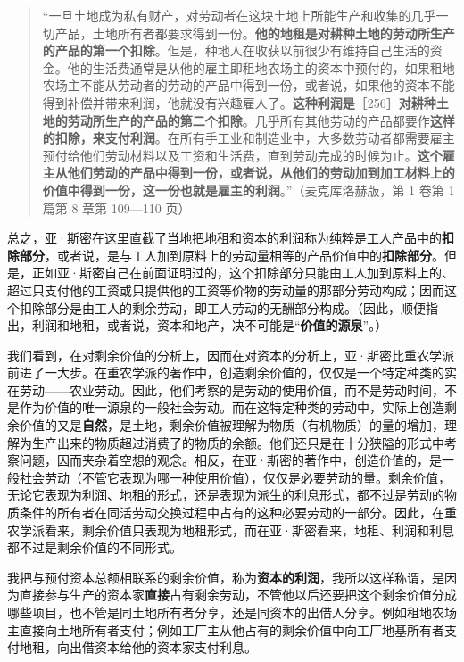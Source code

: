 \begin{quote}“一旦土地成为私有财产，对劳动者在这块土地上所能生产和收集的几乎一切产品，土地所有者都要求得到一份。\textbf{他的地租是对耕种土地的劳动所生产的产品的第一个扣除}。但是，种地人在收获以前很少有维持自己生活的资金。他的生活费通常是从他的雇主即租地农场主的资本中预付的，如果租地农场主不能从劳动者的劳动的产品中得到一份，或者说，如果他的资本不能得到补偿并带来利润，他就没有兴趣雇人了。\textbf{这种利润是}［256］\textbf{对耕种土地的劳动所生产的产品的第二个扣除}。几乎所有其他劳动的产品都要作\textbf{这样的扣除，来支付利润}。在所有手工业和制造业中，大多数劳动者都需要雇主预付给他们劳动材料以及工资和生活费，直到劳动完成的时候为止。\textbf{这个雇主从他们劳动的产品中得到一份，或者说，从他们的劳动加到加工材料上的价值中得到一份，这一份也就是雇主的利润}。”（麦克库洛赫版，第 1 卷第 1 篇第 8 章第 109—110 页）\end{quote}

总之，亚·斯密在这里直截了当地把地租和资本的利润称为纯粹是工人产品中的\textbf{扣除部分}，或者说，是与工人加到原料上的劳动量相等的产品价值中的\textbf{扣除部分}。但是，正如亚·斯密自己在前面证明过的，这个扣除部分只能由工人加到原料上的、超过只支付他的工资或只提供他的工资等价物的劳动量的那部分劳动构成；因而这个扣除部分是由工人的剩余劳动，即工人劳动的无酬部分构成。（因此，顺便指出，利润和地租，或者说，资本和地产，决不可能是“\textbf{价值的源泉}”。）


我们看到，在对剩余价值的分析上，因而在对资本的分析上，亚·斯密比重农学派前进了一大步。在重农学派的著作中，创造剩余价值的，仅仅是一个特定种类的实在劳动——农业劳动。因此，他们考察的是劳动的使用价值，而不是劳动时间，不是作为价值的唯一源泉的一般社会劳动。而在这特定种类的劳动中，实际上创造剩余价值的又是\textbf{自然}，是土地，剩余价值被理解为物质（有机物质）的量的增加，理解为生产出来的物质超过消费了的物质的余额。他们还只是在十分狭隘的形式中考察问题，因而夹杂着空想的观念。相反，在亚·斯密的著作中，创造价值的，是一般社会劳动（不管它表现为哪一种使用价值），仅仅是必要劳动的量。剩余价值，无论它表现为利润、地租的形式，还是表现为派生的利息形式，都不过是劳动的物质条件的所有者在同活劳动交换过程中占有的这种必要劳动的一部分。因此，在重农学派看来，剩余价值只表现为地租形式，而在亚·斯密看来，地租、利润和利息都不过是剩余价值的不同形式。

我把与预付资本总额相联系的剩余价值，称为\textbf{资本的利润}，我所以这样称谓，是因为直接参与生产的资本家\textbf{直接}占有剩余劳动，不管他以后还要把这个剩余价值分成哪些项目，也不管是同土地所有者分享，还是同资本的出借人分享。例如租地农场主直接向土地所有者支付；例如工厂主从他占有的剩余价值中向工厂地基所有者支付地租，向出借资本给他的资本家支付利息。

